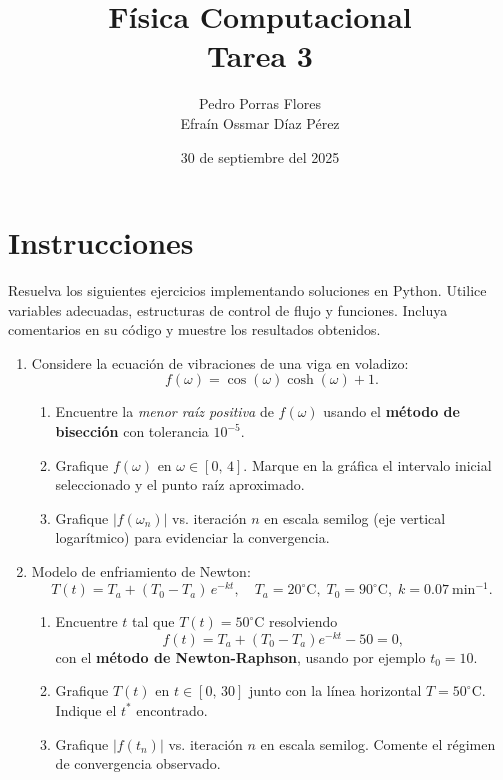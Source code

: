 \documentclass[12pt]{article}
\title{Física Computacional \\ Tarea 3}
\author{Pedro Porras Flores\\ Efraín Ossmar Díaz Pérez}
\date{30 de septiembre del 2025}
\begin{document}
\maketitle

\section*{Instrucciones}
Resuelva los siguientes ejercicios implementando soluciones en Python. Utilice variables adecuadas, estructuras de control de flujo y funciones. Incluya comentarios en su código y muestre los resultados obtenidos.




\begin{enumerate}[label=\textbf{\arabic*.}]

\item 
Considere la ecuación de vibraciones de una viga en voladizo:
\[
f(\omega) = \cos(\omega)\cosh(\omega) + 1 .
\]



\begin{enumerate}
\item Encuentre la \emph{menor raíz positiva} de \(f(\omega)\) usando el \textbf{método de bisección} con tolerancia \(10^{-5}\). \\
  \item Grafique \(f(\omega)\) en \(\omega \in [0,\,4]\). Marque en la gráfica el intervalo inicial seleccionado y el punto raíz aproximado.
  \item Grafique \(|f(\omega_n)|\) vs. iteración \(n\) en escala semilog (eje vertical logarítmico) para evidenciar la convergencia.
\end{enumerate}

\item 
Modelo de enfriamiento de Newton:
\[
T(t) = T_a + (T_0 - T_a)\,e^{-kt}, \quad
T_a=20^\circ\text{C},\; T_0=90^\circ\text{C},\; k=0.07\ \text{min}^{-1}.
\]



\begin{enumerate}
\item Encuentre \(t\) tal que \(T(t)=50^\circ\text{C}\) resolviendo
\[
f(t) = T_a + (T_0 - T_a)e^{-kt} - 50 = 0,
\]
con el \textbf{método de Newton-Raphson}, usando por ejemplo \(t_0=10\). \\
  \item Grafique \(T(t)\) en \(t \in [0,\,30]\) junto con la línea horizontal \(T=50^\circ\text{C}\). Indique el \(t^\ast\) encontrado.
  \item Grafique \(|f(t_n)|\) vs. iteración \(n\) en escala semilog. Comente el régimen de convergencia observado.
\end{enumerate}


\end{enumerate}
\end{document}
